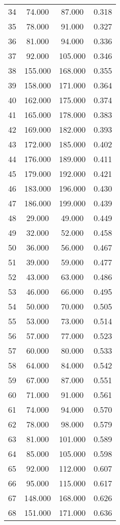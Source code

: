 \begin{tabular}{cccc}
  34 & 74.000 & 87.000 & 0.318 \\ 
  35 & 78.000 & 91.000 & 0.327 \\ 
  36 & 81.000 & 94.000 & 0.336 \\ 
  37 & 92.000 & 105.000 & 0.346 \\ 
  38 & 155.000 & 168.000 & 0.355 \\ 
  39 & 158.000 & 171.000 & 0.364 \\ 
  40 & 162.000 & 175.000 & 0.374 \\ 
  41 & 165.000 & 178.000 & 0.383 \\ 
  42 & 169.000 & 182.000 & 0.393 \\ 
  43 & 172.000 & 185.000 & 0.402 \\ 
  44 & 176.000 & 189.000 & 0.411 \\ 
  45 & 179.000 & 192.000 & 0.421 \\ 
  46 & 183.000 & 196.000 & 0.430 \\ 
  47 & 186.000 & 199.000 & 0.439 \\ 
  48 & 29.000 & 49.000 & 0.449 \\ 
  49 & 32.000 & 52.000 & 0.458 \\ 
  50 & 36.000 & 56.000 & 0.467 \\ 
  51 & 39.000 & 59.000 & 0.477 \\ 
  52 & 43.000 & 63.000 & 0.486 \\ 
  53 & 46.000 & 66.000 & 0.495 \\ 
  54 & 50.000 & 70.000 & 0.505 \\ 
  55 & 53.000 & 73.000 & 0.514 \\ 
  56 & 57.000 & 77.000 & 0.523 \\ 
  57 & 60.000 & 80.000 & 0.533 \\ 
  58 & 64.000 & 84.000 & 0.542 \\ 
  59 & 67.000 & 87.000 & 0.551 \\ 
  60 & 71.000 & 91.000 & 0.561 \\ 
  61 & 74.000 & 94.000 & 0.570 \\ 
  62 & 78.000 & 98.000 & 0.579 \\ 
  63 & 81.000 & 101.000 & 0.589 \\ 
  64 & 85.000 & 105.000 & 0.598 \\ 
  65 & 92.000 & 112.000 & 0.607 \\ 
  66 & 95.000 & 115.000 & 0.617 \\ 
  67 & 148.000 & 168.000 & 0.626 \\ 
  68 & 151.000 & 171.000 & 0.636 \\ 

\end{tabular}
